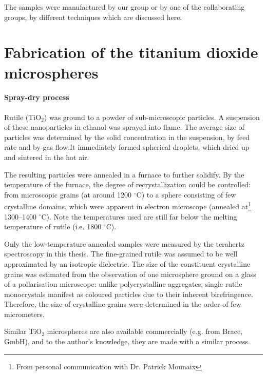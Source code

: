 The samples were manufactured by our group or by one of the collaborating groups, by different techniques which are discussed here. 
\section{Fabrication of the titanium dioxide microspheres}
\paragraph{Spray-dry process}%
Rutile (TiO$_{2}$) was ground to a powder of sub-microscopic particles. 
A suspension of these nanoparticles in ethanol was sprayed into flame. The average size of particles was determined by the solid concentration in the suspension, by feed rate and by gas flow.It immediately formed spherical droplets, which dried up and sintered in the hot air.  

The resulting particles were annealed in a furnace to further solidify. By the temperature of the furnace, the degree of recrystallization could be controlled: from microscopic grains (at around 1200  $^{\circ}$C) to a sphere consisting of few crystalline domains, which were apparent in electron microscope (annealed at\footnote{From personal communication with Dr. Patrick Mounaix} 1300--1400 $^{\circ}$C). Note the temperatures used are still far below the melting temperature of rutile (i.e. 1800 $^{\circ}$C).

Only the low-temperature annealed samples were measured by the terahertz spectroscopy in this thesis. The fine-grained rutile was assumed to be well approximated by an isotropic dielectric. The size of the constituent crystalline grains was estimated from the observation of one microsphere ground on a glass of a pollarisation microscope: unlike polycrystalline aggregates, single rutile monocrystals manifest as coloured particles due to their inherent birefringence. Therefore, the size of crystalline grains were determined in the order of few micrometers.

Similar TiO$_{2}$ microspheres are also available commercially (e.g. from Brace, GmbH), and to the author's knowledge, they are made with a similar process.
